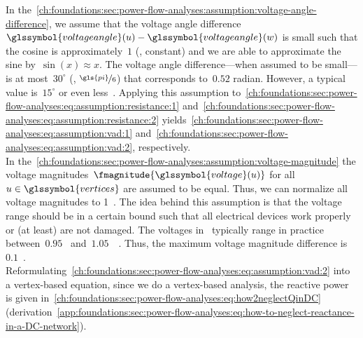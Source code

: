 In
the~\cref{ch:foundations:sec:power-flow-analyses:assumption:voltage-angle-difference},
we assume that the voltage angle difference~$\glssymbol{voltageangle}(\vertexa)
- \glssymbol{voltageangle}(\vertexc)$ is small such that the cosine is
  approximately~$1$ (\ie, constant) and we are able to approximate the sine
  by~$\sin(x)\approx x$. The voltage angle difference---when assumed to be
  small---is at most~$30^\circ$ (\ie, $\nicefrac{\gls{pi}}{6}$) that corresponds
  to~$0.52$ radian. However, a typical value is~$15^\circ$ or even
  less~\parencite{Pur05}. Applying this assumption
  to~\cref{ch:foundations:sec:power-flow-analyses:eq:assumption:resistance:1}
  and~\cref{ch:foundations:sec:power-flow-analyses:eq:assumption:resistance:2}
  yields~\cref{ch:foundations:sec:power-flow-analyses:eq:assumption:vad:1}
  and~\cref{ch:foundations:sec:power-flow-analyses:eq:assumption:vad:2},
  respectively.
% 
\begin{subequations}%
    
    \label{ch:foundations:sec:power-flow-analyses:eq:assumption:vad}
\end{subequations}%
%
In
the~\cref{ch:foundations:sec:power-flow-analyses:assumption:voltage-magnitude}
the voltage magnitudes~$\fmagnitude{\glssymbol{voltage}(\vertexa)}$ for
all~$\vertexa\in\glssymbol{vertices}$ are assumed to be equal. Thus, we can
normalize all voltage magnitudes to 1~. The idea behind this
assumption is that the voltage range should be in a certain bound such that all
electrical devices work properly or (at least) are not damaged. The voltages
in~ typically range in practice between~$0.95$~
and~$1.05$~~\parencite{Pur05}. Thus, the maximum voltage magnitude
difference is~$0.1$~.
% 
\begin{subequations}%
    
    \label{ch:foundations:sec:power-flow-analyses:eq:assumption:vm}
\end{subequations}%
%
Reformulating~\cref{ch:foundations:sec:power-flow-analyses:eq:assumption:vad:2}
into a vertex-based equation, since we do a vertex-based analysis, the reactive
power is given
in~\cref{ch:foundations:sec:power-flow-analyses:eq:how2neglectQinDC}
(derivation~\cref{app:foundations:sec:power-flow-analyses:eq:how-to-neglect-reactance-in-a-DC-network}).
% 
\begin{subequations}%
    
    \label{ch:foundations:sec:power-flow-analyses:eq:how2neglectQinDC}
\end{subequations}%
